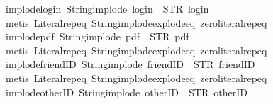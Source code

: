 \begin{isabellebody}
\isanewline
{}\isamarkupfalse%
\ implode{\isacharunderscore}login{\isacharcolon}\ {\isachardoublequoteopen}String{\isachardot}implode\ {\isacharprime}{\isacharprime}login{\isacharprime}{\isacharprime}\ {\isacharequal}\ STR\ {\isacharprime}{\isacharprime}login{\isacharprime}{\isacharprime}{\isachardoublequoteclose}\isanewline
%
\isadelimproof
\ \ %
\endisadelimproof
%
\isatagproof
{}\isamarkupfalse%
\ {\isacharparenleft}metis\ Literal{\isachardot}rep{\isacharunderscore}eq\ String{\isachardot}implode{\isacharunderscore}explode{\isacharunderscore}eq\ zero{\isacharunderscore}literal{\isachardot}rep{\isacharunderscore}eq{\isacharparenright}%
\endisatagproof
{\isafoldproof}%
%
\isadelimproof
\isanewline
%
\endisadelimproof
\isanewline
{}\isamarkupfalse%
\ implode{\isacharunderscore}pdf{\isacharcolon}\ {\isachardoublequoteopen}String{\isachardot}implode\ {\isacharprime}{\isacharprime}pdf{\isacharprime}{\isacharprime}\ {\isacharequal}\ STR\ {\isacharprime}{\isacharprime}pdf{\isacharprime}{\isacharprime}{\isachardoublequoteclose}\isanewline
%
\isadelimproof
\ \ %
\endisadelimproof
%
\isatagproof
{}\isamarkupfalse%
\ {\isacharparenleft}metis\ Literal{\isachardot}rep{\isacharunderscore}eq\ String{\isachardot}implode{\isacharunderscore}explode{\isacharunderscore}eq\ zero{\isacharunderscore}literal{\isachardot}rep{\isacharunderscore}eq{\isacharparenright}%
\endisatagproof
{\isafoldproof}%
%
\isadelimproof
\isanewline
%
\endisadelimproof
\isanewline
{}\isamarkupfalse%
\ implode{\isacharunderscore}friendID{\isacharcolon}\ {\isachardoublequoteopen}String{\isachardot}implode\ {\isacharprime}{\isacharprime}friendID{\isacharprime}{\isacharprime}\ {\isacharequal}\ STR\ {\isacharprime}{\isacharprime}friendID{\isacharprime}{\isacharprime}{\isachardoublequoteclose}\isanewline
%
\isadelimproof
\ \ %
\endisadelimproof
%
\isatagproof
{}\isamarkupfalse%
\ {\isacharparenleft}metis\ Literal{\isachardot}rep{\isacharunderscore}eq\ String{\isachardot}implode{\isacharunderscore}explode{\isacharunderscore}eq\ zero{\isacharunderscore}literal{\isachardot}rep{\isacharunderscore}eq{\isacharparenright}%
\endisatagproof
{\isafoldproof}%
%
\isadelimproof
\isanewline
%
\endisadelimproof
\isanewline
{}\isamarkupfalse%
\ implode{\isacharunderscore}otherID{\isacharcolon}\ {\isachardoublequoteopen}String{\isachardot}implode\ {\isacharprime}{\isacharprime}otherID{\isacharprime}{\isacharprime}\ {\isacharequal}\ STR\ {\isacharprime}{\isacharprime}otherID{\isacharprime}{\isacharprime}{\isachardoublequoteclose}\isanewline

\end{isabellebody}
